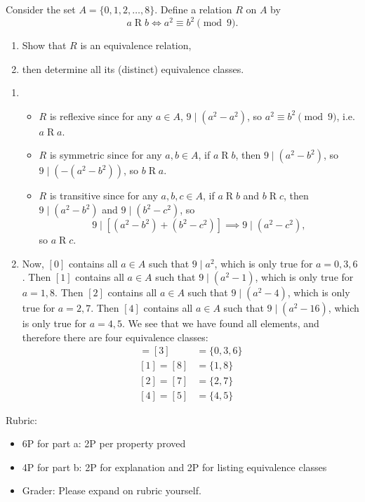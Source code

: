 \documentclass{article}
\theoremstyle{definition}
\begin{document}
\begin{question}
    Consider the set $A = \{0, 1, 2, \dots, 8 \}$. Define a relation $R$ on $A$ by
	\[
	a\mathrel{R}b \iff a^2 \equiv b^2 \pmod{9}.
	\]
	\begin{enumerate}
	\item Show that $R$ is an equivalence relation, 
	\item then determine all its (distinct) equivalence classes.
	\end{enumerate}
\end{question}
\begin{solution}
	\begin{enumerate}
	\item 
	\begin{itemize} 
		\item $ R$ is reflexive since for any $a \in A$, $9 \mid (a^2 - a^2)$, so $a^2 \equiv b^2 \pmod{9}$, i.e. $a \mathrel{R}a$.
		\item $ R$ is symmetric since for any $a,b \in A$, if $a \mathrel{R}b$, then $9 \mid (a^2 - b^2)$, so $9 \mid \left(- (a^2 - b^2)\right)$, so $b \mathrel{R}a$.
		\item $R$ is transitive since for any $a,b, c \in A$, if $a \mathrel{R}b$ and $b \mathrel{R}c$, then $9 \mid (a^2 - b^2)$ and $9 \mid (b^2 - c^2)$, so 
		\[
		9 \mid \left[(a^ 2 - b^2) + (b^2 - c^2)\right] 
		\implies 9 \mid (a^2 - c^2),
		\]
		so $a \mathrel{R}c$.
	\end{itemize}
	\item Now, $[0]$ contains all $a \in A$ such that $9 \mid a^2$, which is only true for $a = 0, 3, 6$. Then $[1]$ contains all $a \in A$ such that $9 \mid (a^2 - 1)$, which is only true for $a = 1, 8$. Then $[2]$ contains all $a \in A$ such that $9 \mid (a^2 - 4)$, which is only true for $a = 2, 7$. Then $[4]$ contains all $a \in A$ such that $9 \mid (a^2 - 16)$, which is only true for $a = 4, 5$. We see that we have found all elements, and therefore there are four equivalence classes:
		\begin{align*}
		[0] = [3] &= \{ 0, 3, 6 \} \\
		[1] = [8] &= \{ 1, 8 \} \\
		[2] = [7] &= \{ 2, 7 \} \\
		[4] = [5] &= \{ 4, 5 \}
		\end{align*}
	\end{enumerate}
{\color{red} Rubric:
\begin{itemize}
\item 6P for part a: 2P per property proved
\item 4P for part b: 2P for explanation and 2P for listing equivalence classes
\item Grader: Please expand on rubric yourself.
\end{itemize}}
\end{solution}
\end{document}
